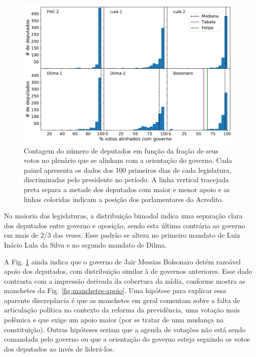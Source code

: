 \documentclass[12pt,a4paper]{article}
\begin{document}
\begin{figure}[H]
\centering
\includegraphics[width=1.0\textwidth]{graficos/apoio_ao_governo_deputados_2019-05-03.pdf}
\caption{Contagem do número de deputados em função da fração de seus votos no plenário que se
  alinham com a orientação do governo. Cada painel apresenta os dados dos 100 primeiros dias de
  cada legislatura, discriminadas pelo presidente no período. A linha vertical tracejada preta
  separa a metade dos deputados com maior e menor apoio e as linhas coloridas indicam a posição
  dos parlamentares do Acredito.}
\label{fig:apoio-governo-deputados}
\end{figure} 

Na maioria das legislaturas, a distribuição bimodal indica uma separação clara dos deputados
entre governo e oposição, sendo esta última contrária ao governo em mais de 2/3 das vezes.
Esse padrão se altera no primeiro mandato de Luiz Inácio Lula da Silva e no segundo mandato de Dilma.

A Fig. \ref{fig:apoio-governo-deputados} ainda indica que o governo de Jair Messias Bolsonaro detém
razoável apoio dos deputados, com distribuição similar à de governos anteriores. Esse dado contrasta
com a impressão derivada da cobertura da mídia, conforme mostra as manchetes da Fig. \ref{fig:manchetes-apoio}.
Uma hipótese para explicar essa aparente discrepância é que as manchetes em geral comentam sobre
a falta de articulação política no contexto da reforma da previdência, uma votação mais polêmica e
que exige um apoio maior (por se tratar de uma mudança na constituição). Outras hipóteses seriam
que a agenda de votações não está sendo comandada pelo governo ou que a orientação do governo esteja
seguindo os votos dos deputados ao invés de liderá-los.
\end{document}
